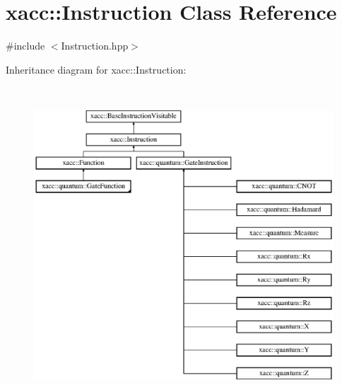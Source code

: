 \hypertarget{a00037}{}\section{xacc\+:\+:Instruction Class Reference}
\label{a00037}


{\ttfamily \#include $<$Instruction.\+hpp$>$}

Inheritance diagram for xacc\+:\+:Instruction\+:\begin{figure}[H]
\begin{center}
\leavevmode
\includegraphics[height=11.851852cm]{a00037}
\end{center}
\end{figure}
